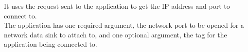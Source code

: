 It uses the  request sent to the
 application to get the IP address and port to connect
to.\\

The application has one required argument, the network port to be opened for a network
data sink to attach to, and one optional argument, the tag for the
 application being connected to.
\insertShortClientParameters
{}
\secondaryEnd
\primaryEnd{}
